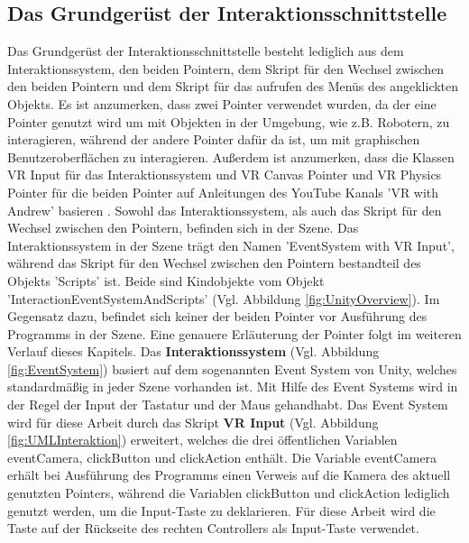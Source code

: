 \subsection{Das Grundgerüst der Interaktionsschnittstelle}\label{sec:GrundgerüstInteraktion}
Das Grundgerüst der Interaktionsschnittstelle besteht lediglich aus dem Interaktionssystem, den beiden Pointern, dem Skript für den Wechsel zwischen den beiden Pointern und dem Skript für das aufrufen des Menüs des angeklickten Objekts. Es ist anzumerken, dass zwei Pointer verwendet wurden, da der eine Pointer genutzt wird um mit Objekten in der Umgebung, wie z.B. Robotern, zu interagieren, während der andere Pointer dafür da ist, um mit graphischen Benutzeroberflächen zu interagieren. Außerdem ist anzumerken, dass die Klassen VR Input für das Interaktionssystem und VR Canvas Pointer und VR Physics Pointer für die beiden Pointer auf Anleitungen des YouTube Kanals 'VR with Andrew' basieren \cite{32}. Sowohl das Interaktionssystem, als auch das Skript für den Wechsel zwischen den Pointern, befinden sich in der Szene. Das Interaktionssystem in der Szene trägt den Namen 'EventSystem with VR Input', während das Skript für den Wechsel zwischen den Pointern bestandteil des Objekts 'Scripts' ist. Beide sind Kindobjekte vom Objekt 'InteractionEventSystemAndScripts' (Vgl. Abbildung \ref{fig:UnityOverview}). Im Gegensatz dazu, befindet sich keiner der beiden Pointer vor Ausführung des Programms in der Szene. Eine genauere Erläuterung der Pointer folgt im weiteren Verlauf dieses Kapitels.
\newline\newline
Das \textbf{Interaktionssystem} (Vgl. Abbildung \ref{fig:EventSystem}) basiert auf dem sogenannten Event System von Unity, welches standardmäßig in jeder Szene vorhanden ist. Mit Hilfe des Event Systems wird in der Regel der Input der Tastatur und der Maus gehandhabt. Das Event System wird für diese Arbeit durch das Skript \textbf{VR Input} (Vgl. Abbildung \ref{fig:UMLInteraktion}) erweitert, welches die drei öffentlichen Variablen eventCamera, clickButton und clickAction enthält. Die Variable eventCamera erhält bei Ausführung des Programms einen Verweis auf die Kamera des aktuell genutzten Pointers, während die Variablen clickButton und clickAction lediglich genutzt werden, um die Input-Taste zu deklarieren. Für diese Arbeit wird die Taste auf der Rückseite des rechten Controllers als Input-Taste verwendet.
\newline

